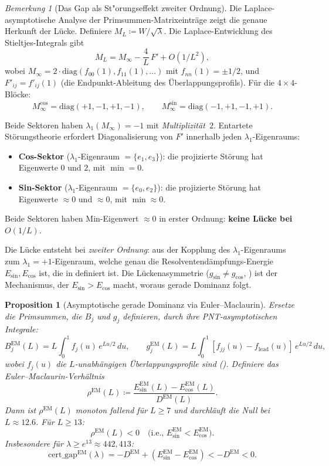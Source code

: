 ﻿\documentclass[12pt,a4paper]{article}
\newtheorem{proposition}[theorem]{Proposition}
\theoremstyle{definition}
\theoremstyle{remark}
\newtheorem{remark}[theorem]{Bemerkung}
\begin{document}
\begin{remark}[Das Gap als St"orungseffekt zweiter Ordnung]
\label{rem:gap-source}
Die Laplace-asymptotische Analyse der Primsummen-Matrixeinträge zeigt die genaue Herkunft der Lücke. Definiere $M_L \coloneqq W/\sqrt{\lambda}$. Die Laplace-Entwicklung des Stieltjes-Integrals gibt
\[
  M_L = M_\infty - \frac{4}{L}\,F' + O(1/L^2),
\]
wobei $M_\infty = 2 \cdot \mathrm{diag}(f_{00}(1), f_{11}(1), \ldots)$
mit $f_{nn}(1) = \pm 1/2$, und $F'_{ij} = f'_{ij}(1)$
(die Endpunkt-Ableitung des Überlappungsprofils). Für die
$4 \times 4$-Blöcke:
\[
  M_\infty^{\cos} = \mathrm{diag}(+1,-1,+1,-1), \qquad
  M_\infty^{\sin} = \mathrm{diag}(-1,+1,-1,+1).
\]

Beide Sektoren haben $\lambda_1(M_\infty) = -1$ mit \emph{Multiplizität~$2$}. Entartete Störungstheorie erfordert Diagonalisierung von $F'$ innerhalb jeden $\lambda_1$-Eigenraums:
\begin{itemize}
  \item \textbf{Cos-Sektor} ($\lambda_1$-Eigenraum $= \{e_1, e_3\}$): die projizierte Störung hat Eigenwerte $0$ und $2$, mit $\min = 0$.
  \item \textbf{Sin-Sektor} ($\lambda_1$-Eigenraum $= \{e_0, e_2\}$): die projizierte Störung hat Eigenwerte $\approx 0$ und $\approx 0$, mit $\min \approx 0$.
\end{itemize}
Beide Sektoren haben Min-Eigenwert $\approx 0$ in erster Ordnung: \textbf{keine Lücke bei $O(1/L)$}.

Die Lücke entsteht bei \emph{zweiter Ordnung}: aus der Kopplung des $\lambda_1$-Eigenraums zum $\lambda_1 = +1$-Eigenraum, welche genau die Resolventendämpfungs-Energie $E_{\sin}, E_{\cos}$ ist, die in  definiert ist. Die Lückenasymmetrie ($g_{\sin} \neq g_{\cos}$, ) ist der Mechanismus, der $E_{\sin} > E_{\cos}$ macht, woraus gerade Dominanz folgt.
\end{remark}

\begin{proposition}[Asymptotische gerade Dominanz via Euler--Maclaurin]
\label{prop:euler-maclaurin}
Ersetze die Primsummen, die $B_j$ und $g_j$ definieren, durch ihre PNT-asymptotischen Integrale:
\[
  B_j^{\mathrm{EM}}(L) = L\!\int_0^1 f_j(u)\,e^{Lu/2}\,du, \qquad
  g_j^{\mathrm{EM}}(L) = L\!\int_0^1 [f_{jj}(u) - f_{\mathrm{lead}}(u)]\,e^{Lu/2}\,du,
\]
wobei $f_j(u)$ die $L$-unabhängigen Überlappungsprofile sind (). Definiere das Euler--Maclaurin-Verhältnis
\[
  \rho^{\mathrm{EM}}(L) \coloneqq \frac{E_{\sin}^{\mathrm{EM}}(L) - E_{\cos}^{\mathrm{EM}}(L)}{D^{\mathrm{EM}}(L)}.
\]
Dann ist $\rho^{\mathrm{EM}}(L)$ monoton fallend für $L \geq 7$ und durchläuft die Null bei $L \approx 12.6$. Für $L \geq 13$:
\[
  \rho^{\mathrm{EM}}(L) < 0 \quad\text{(i.e., } E_{\sin}^{\mathrm{EM}} < E_{\cos}^{\mathrm{EM}}\text{)}.
\]
Insbesondere für $\lambda \geq e^{13} \approx 442{,}413$:
\[
  \mathrm{cert\_gap}^{\mathrm{EM}}(\lambda) = -D^{\mathrm{EM}} + (E_{\sin}^{\mathrm{EM}} - E_{\cos}^{\mathrm{EM}}) < -D^{\mathrm{EM}} < 0.
\]
\end{proposition}
\end{document}
